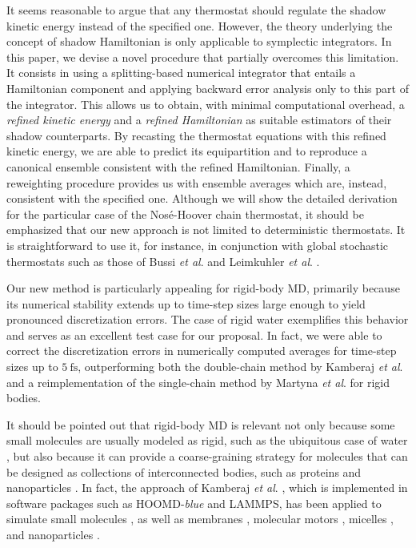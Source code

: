 \documentclass[
	aip,
	jcp,
	reprint,
]{revtex4-1}
\begin{document}
It seems reasonable to argue that any thermostat should regulate the shadow kinetic energy instead of the specified one.
However, the theory underlying the concept of shadow Hamiltonian is only applicable to symplectic integrators.
In this paper, we devise a novel procedure that partially overcomes this limitation.
It consists in using a splitting-based numerical integrator that entails a Hamiltonian component and applying backward error analysis only to this part of the integrator.
This allows us to obtain, with minimal computational overhead, a \textit{refined kinetic energy} and a \textit{refined Hamiltonian} as suitable estimators of their shadow counterparts.
By recasting the thermostat equations with this refined kinetic energy, we are able to predict its equipartition and to reproduce a canonical ensemble consistent with the refined Hamiltonian.
Finally, a reweighting procedure provides us with ensemble averages which are, instead, consistent with the specified one.
Although we will show the detailed derivation for the particular case of the Nos\'{e}-Hoover chain thermostat, it should be emphasized that our new approach is not limited to deterministic thermostats. 
It is straightforward to use it, for instance, in conjunction with global stochastic thermostats such as those of Bussi \textit{et al}. \cite{Bussi_2007} and Leimkuhler \textit{et al}. \cite{Leimkuhler_2009}.

Our new method is particularly appealing for rigid-body MD, primarily because its numerical stability extends up to time-step sizes large enough to yield pronounced discretization errors.
The case of rigid water exemplifies this behavior and serves as an excellent test case for our proposal.
In fact, we were able to correct the discretization errors in numerically computed averages for time-step sizes up to $5~\text{fs}$, outperforming both the double-chain method by Kamberaj \textit{et al}. \cite{Kamberaj_2005} and a reimplementation of the single-chain method by Martyna \textit{et al}. \cite{Martyna_1996} for rigid bodies.

It should be pointed out that rigid-body MD is relevant not only because some small molecules are usually modeled as rigid, such as the ubiquitous case of water \cite{Jorgensen_1983}, but also because it can provide a coarse-graining strategy for molecules that can be designed as collections of interconnected bodies, such as proteins and nanoparticles \cite{Miller_2002, Knorowski_2012, Patra_2013}.
In fact, the approach of Kamberaj \textit{et al}. \cite{Kamberaj_2005}, which is implemented in software packages such as HOOMD-\textit{blue}\cite{Anderson_2008} and LAMMPS\cite{Plimpton_1995}, has been applied to simulate small molecules \cite{Geiger_2013, Aimoli_2014, Aimoli_2014_2}, as well as membranes \cite{Bucior_2012}, molecular motors \cite{Akimov_2012}, micelles \cite{Yan_2008}, and nanoparticles \cite{Patra_2014}.
\end{document}

